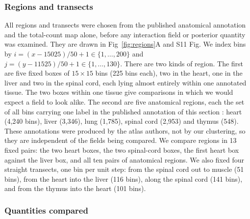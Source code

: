 \documentclass[10pt,letterpaper]{article}
\begin{document}
\subsubsection*{Regions and transects}

All regions and transects were chosen from the published anatomical annotation and the total-count map alone, before any interaction field or posterior quantity was examined. They are drawn in Fig~\ref{fig:regions}A and S11 Fig. We index bins by $i = (x - 15025)/50 + 1 \in \{1,\dots,200\}$ and $j = (y - 11525)/50 + 1 \in \{1,\dots,130\}$. There are two kinds of region. The first are five fixed boxes of $15 \times 15$ bins (225 bins each), two in the heart, one in the liver and two in the spinal cord, each lying almost entirely within one annotated tissue. The two boxes within one tissue give comparisons in which we would expect a field to look alike. The second are five anatomical regions, each the set of all bins carrying one label in the published annotation of this section \cite{Chen2022}: heart (4,240 bins), liver (3,346), lung (1,785), spinal cord (2,953) and thymus (548). These annotations were produced by the atlas authors, not by our clustering, so they are independent of the fields being compared. We compare regions in 13 fixed pairs: the two heart boxes, the two spinal-cord boxes, the first heart box against the liver box, and all ten pairs of anatomical regions. We also fixed four straight transects, one bin per unit step: from the spinal cord out to muscle (51 bins), from the heart into the liver (116 bins), along the spinal cord (141 bins), and from the thymus into the heart (101 bins).

\subsubsection*{Quantities compared}
\end{document}
